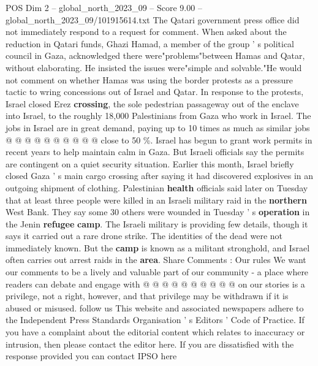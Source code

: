 \begin{textsample}{POS Dim 2 – global\_north\_2023\_09 – Score 9.00 – global\_north\_2023\_09/101915614.txt}
The Qatari government press office did not immediately respond to a request for comment.
When asked about the reduction in Qatari funds, Ghazi Hamad, a member of the group ' s political council in Gaza, acknowledged there were"problems"between Hamas and Qatar, without elaborating.
He insisted the issues were"simple and solvable."He would not comment on whether Hamas was using the border protests as a pressure tactic to wring concessions out of Israel and Qatar.
In response to the protests, Israel closed Erez \textbf{crossing}, the sole pedestrian passageway out of the enclave into Israel, to the roughly 18,000 Palestinians from Gaza who work in Israel.
The jobs in Israel are in great demand, paying up to 10 times as much as similar jobs @ @ @ @ @ @ @ @ @ @ close to 50 \%.
Israel has begun to grant work permits in recent years to help maintain calm in Gaza.
But Israeli officials say the permits are contingent on a quiet security situation.
Earlier this month, Israel briefly closed Gaza ' s main cargo crossing after saying it had discovered explosives in an outgoing shipment of clothing.
Palestinian \textbf{health} officials said later on Tuesday that at least three people were killed in an Israeli military raid in the \textbf{northern} West Bank.
They say some 30 others were wounded in Tuesday ' s \textbf{operation} in the Jenin \textbf{refugee} \textbf{camp}.
The Israeli military is providing few details, though it says it carried out a rare drone strike.
The identities of the dead were not immediately known.
But the \textbf{camp} is known as a militant stronghold, and Israel often carries out arrest raids in the \textbf{area}.
Share Comments : Our rules We want our comments to be a lively and valuable part of our community - a place where readers can debate and engage with @ @ @ @ @ @ @ @ @ @ on our stories is a privilege, not a right, however, and that privilege may be withdrawn if it is abused or misused. follow us This website and associated newspapers adhere to the Independent Press Standards Organisation ' s Editors ' Code of Practice.
If you have a complaint about the editorial content which relates to inaccuracy or intrusion, then please contact the editor here.
If you are dissatisfied with the response provided you can contact IPSO here

\end{textsample}

